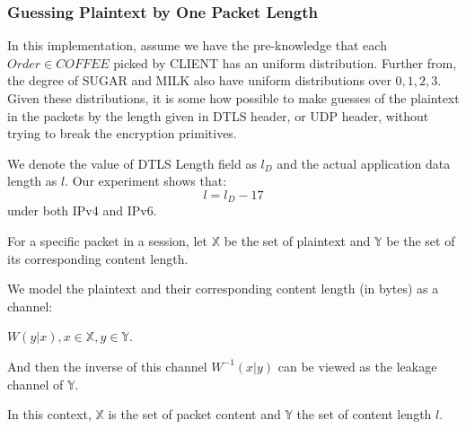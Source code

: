 \subsubsection{Guessing Plaintext by One Packet Length}
In this implementation, assume we have the pre-knowledge that each $Order \in COFFEE$ picked by CLIENT has an uniform distribution. Further from, the degree of SUGAR and MILK also have uniform distributions over ${0,1,2,3}$. Given these distributions, it is some how possible to make guesses of the plaintext in the packets by the length given in DTLS header, or UDP header, without trying to break the encryption primitives.

We denote the value of DTLS Length field as $l_D$ and the actual application data length as $l$. Our experiment shows that:
\begin{equation}
l = l_D - 17
\end{equation}
under both IPv4 and IPv6.

\begin{definition}
For a specific packet in a session, let $\mathbb{X}$ be the set of plaintext and $\mathbb{Y}$ be the set of its corresponding content length.

 We model the plaintext  and their corresponding content length (in bytes) as a channel: 
 \begin{center}
 $W(y|x), x \in \mathbb{X}, y \in \mathbb{Y}$.
 \end{center}

And then the inverse of this channel $W^{-1}(x|y)$ can be viewed as the leakage channel of $\mathbb{Y}$.
\end{definition}

In this context, $\mathbb{X}$ is the set of packet content and $\mathbb{Y}$ the set of content length $l$.


